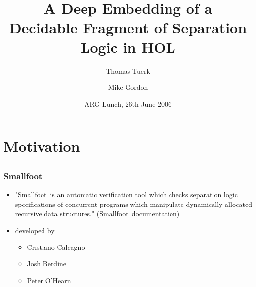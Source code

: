
\title[Deep Embeeding of Separation Logic]{A Deep Embedding of a \\Decidable Fragment of Separation Logic in HOL}
\author[Tuerk, Gordon]{Thomas Tuerk \and Mike Gordon}
\date{ARG Lunch, 26th June 2006}

\newcommand{\smallfoot}{{\sf Smallfoot}}
\newcommand{\HOL}{{\sf HOL}}
\newcommand{\nil}{{\textsf{nil}}}
\newcommand{\pftrue}{{\textsf{true}}}
\newcommand{\pfequal}[2]{\ensuremath{#1 \doteq #2}}
\newcommand{\pfunequal}[2]{\ensuremath{#1 \not\doteq #2}}
\newcommand{\values}{{\emph{Values}}}
\newcommand{\valuesnil}{\ensuremath{\values_\nil}}
\newcommand{\vars}{{\emph{Vars}}}
\newcommand{\expr}{{\emph{Exp}}}
\newcommand{\fields}{{\emph{Fields}}}
\newcommand{\pf}{{\emph{pf}}}
\newcommand{\sfset}{{\emph{sf}}}
\newcommand{\modelspf}{{\models_{\textit{pf}}\ }}
\newcommand{\modelssf}{{\models_{\textit{sf}}\ }}
\newcommand{\modelsds}{{\models_{\textit{ds}}\ }}


\newcommand{\sfemp}{{\textsf{emp}}}
\newcommand{\sftree}{{\textsf{tree}}}
\newcommand{\sfpointsto}[2]{#1 \hookrightarrow [#2]}
\newcommand{\sfbintree}{{\textsf{bin-tree}}}
\newcommand{\sflist}{{\textsf{ls}}}

\newcommand{\varpf}[1]{\textit{pf}_{#1}}
\newcommand{\varsf}[1]{\textit{sf}_{#1}}
\newcommand{\varel}{\eta}
\newcommand{\varepl}{\pi}

\newcommand{\heapdistinct}{\textit{heap\_distinct}}
\newcommand{\entailment}[2]{#1\ \vdash\ #2}
\newcommand{\dom}{{\text{dom}}}
\newcommand{\tofin}{\xrightarrow{fin}}

\newcommand{\eqinferstyle}{
\mprset{fraction={={\raisebox{0pt}[5pt][5pt]{=}}=}}}




\frame{\titlepage}


\section{Motivation}
\subsection*{}

\begin{frame}
\frametitle{Smallfoot}
\begin{itemize}
\item "\smallfoot\ is an automatic verification tool which checks separation
logic specifications of concurrent programs which manipulate
dynamically-allocated recursive data structures." (\smallfoot\ documentation)
\item developed by 
\begin{itemize}
\item Cristiano Calcagno
\item Josh Berdine
\item Peter O'Hearn
\end{itemize}
\end{itemize}
\end{frame}

